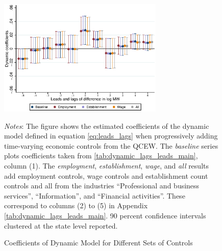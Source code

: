 \clearpage
\begin{figure}[!h]
	\caption{Coefficients of Dynamic Model for Different Sets of Controls}
	\label{fig:}
	\centering
	\includegraphics[width = 0.7\textwidth]
		{../../analysis/first_differences/output/fd_models_control.eps}
	\begin{minipage}{.95\textwidth} \footnotesize
		\vspace{2mm} 
		\textit{Notes}: The figure shows the estimated coefficients of the dynamic model defined 
		in equation \autoref{eq:leads_lags} when progressively adding time-varying economic controls 
		from the QCEW. The \textit{baseline} series plots coefficients taken from 
		\autoref{tab:dynamic_lags_leads_main}, column (1). The \textit{employment}, \textit{establishment}, 
		\textit{wage}, and \textit{all} results add employment controls, wage controls and establishment 
		count controls and all from the industries ``Professional and business services'', ``Information'', 
		and ``Financial activities''. These correspond to columns (2) to (5) in Appendix 
		\autoref{tab:dynamic_lags_leads_main}. 90 percent confidence intervals clustered at the state 
		level reported.
	\end{minipage}
\end{figure}

